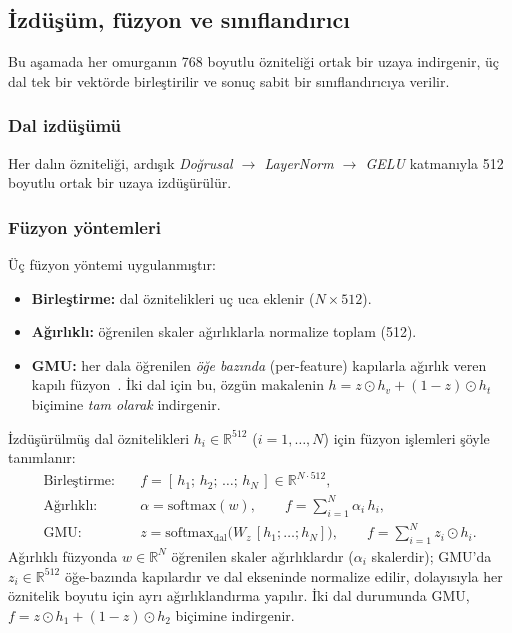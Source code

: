 \subsection{İzdüşüm, füzyon ve sınıflandırıcı}
Bu aşamada her omurganın 768 boyutlu özniteliği ortak bir uzaya indirgenir, üç dal
tek bir vektörde birleştirilir ve sonuç sabit bir sınıflandırıcıya verilir.

\subsubsection{Dal izdüşümü}
Her dalın özniteliği, ardışık \emph{Doğrusal $\to$ LayerNorm $\to$ GELU}
katmanıyla 512 boyutlu ortak bir uzaya izdüşürülür.

\subsubsection{Füzyon yöntemleri}
Üç füzyon yöntemi uygulanmıştır:
\begin{itemize}
  \item \textbf{Birleştirme:} dal öznitelikleri uç uca eklenir ($N{\times}512$).
  \item \textbf{Ağırlıklı:} öğrenilen skaler ağırlıklarla normalize toplam (512).
  \item \textbf{GMU:} her dala öğrenilen \emph{öğe bazında} (per-feature) kapılarla
        ağırlık veren kapılı füzyon~\cite{arevalo2017gmu}. İki dal için bu, özgün
        makalenin $h = z \odot h_v + (1-z)\odot h_t$ biçimine \emph{tam olarak}
        indirgenir.
\end{itemize}
İzdüşürülmüş dal öznitelikleri $h_i \in \mathbb{R}^{512}$ ($i = 1,\dots,N$) için
füzyon işlemleri şöyle tanımlanır:
\begin{align}
  \text{Birleştirme:}\quad & f = [\,h_1;\, h_2;\, \dots;\, h_N\,] \in \mathbb{R}^{N\cdot 512}, \\
  \text{Ağırlıklı:}\quad & \alpha = \mathrm{softmax}(w),\qquad f = \sum_{i=1}^{N} \alpha_i\, h_i, \\
  \text{GMU:}\quad & z = \mathrm{softmax}_{\text{dal}}\!\big(W_z\,[h_1;\dots;h_N]\big),\qquad
                     f = \sum_{i=1}^{N} z_i \odot h_i.
\end{align}
Ağırlıklı füzyonda $w \in \mathbb{R}^{N}$ öğrenilen skaler ağırlıklardır ($\alpha_i$
skalerdir); GMU'da $z_i \in \mathbb{R}^{512}$ öğe-bazında kapılardır ve dal ekseninde
normalize edilir, dolayısıyla her öznitelik boyutu için ayrı ağırlıklandırma yapılır.
İki dal durumunda GMU, $f = z \odot h_1 + (1-z) \odot h_2$ biçimine indirgenir.

